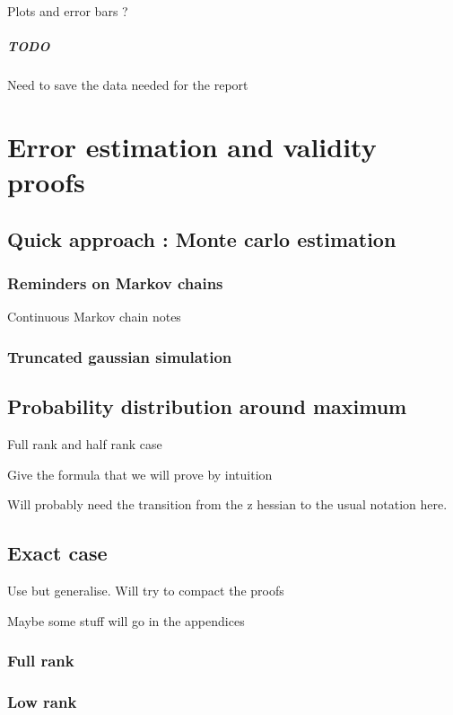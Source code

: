 \documentclass[10pt]{report}
\begin{document}
Plots and error bars ?

\paragraph{TODO} Need to save the data needed for the report

\chapter{Error estimation and validity proofs}
\section{Quick approach : Monte carlo estimation}
\subsection{Reminders on Markov chains}

Continuous Markov chain notes

\subsection{Truncated gaussian simulation}

\section{Probability distribution around maximum}

Full rank and half rank case

Give the formula that we will prove by intuition

Will probably need the transition from the z hessian to the usual notation here.

\section{Exact case}

Use \cite{SPRAL17} but generalise. Will try to compact the proofs

Maybe some stuff will go in the appendices
\subsection{Full rank}

\subsection{Low rank}
\end{document}
